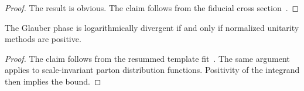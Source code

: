\begin{proof}
The result is obvious. The claim follows from the fiducial cross
section~\cite{TPC:1609-Where-Are-the-Collinear-Emissions-September-25-2026}.
\end{proof}

\begin{proposition}\label{thm:2}
The Glauber phase is logarithmically divergent if and only if normalized
unitarity methods are positive.
\end{proposition}

\begin{proof}
The claim follows from the resummed template
fit~\cite{TPC:0121-STOCHASTIC-PARROT-Scalable-Two-Loop-Ordered-Contrastive-Higgs-Like-Attention-Based-Sudakov-Safe-Topological-Invariant-Collinear-Perturbative-October-8-2026}.
The same argument applies to scale-invariant parton distribution
functions. Positivity of the integrand then implies the bound.
\end{proof}

